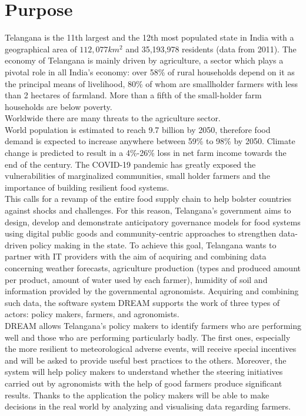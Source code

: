 \section{Purpose}

Telangana is the 11th largest and the 12th most populated state in India with a geographical area of $112,077 km^2$ and 35,193,978 residents (data from 2011).
The economy of Telangana is mainly driven by agriculture, a sector which plays a pivotal role in all India’s economy: over 58\% of rural households depend on it as the principal means of livelihood, 80\% of whom are smallholder farmers with less than 2 hectares of farmland. More than a fifth of the small-holder farm households are below poverty. \\

Worldwide there are many threats to the agriculture sector.\\ World population is estimated to reach 9.7 billion by 2050, therefore food demand is expected to increase anywhere between 59\% to 98\% by 2050. Climate change is predicted to result in a 4\%-26\% loss in net farm income towards the end of the century. The COVID-19 pandemic has greatly exposed the vulnerabilities of marginalized communities, small holder farmers and the importance of building resilient food systems.\\

This calls for a revamp of the entire food supply chain to help bolster countries against shocks and challenges. For this reason, Telangana’s government aims to design, develop and demonstrate anticipatory governance models for food systems using digital public goods and community-centric approaches to strengthen data-driven policy making in the state. To achieve this goal, Telangana wants to partner with IT providers with the aim of acquiring and combining data concerning weather forecasts, agriculture production (types and produced amount per product, amount of water used by each farmer), humidity of soil and information provided by the governmental agronomists. Acquiring and combining such data, the software system DREAM supports the work of three types of actors: policy makers, farmers, and agronomists.\\

DREAM allows Telangana’s policy makers to identify farmers who are performing well and those who are performing particularly badly. The first ones, especially the more resilient to meteorological adverse events, will receive special incentives and will be asked to provide useful best practices to the others. Moreover, the system will help policy makers to understand whether the steering initiatives carried out by agronomists with the help of good farmers produce significant results.
Thanks to the application the policy makers will be able to make decisions in the real world by analyzing and visualising data regarding farmers.\\

